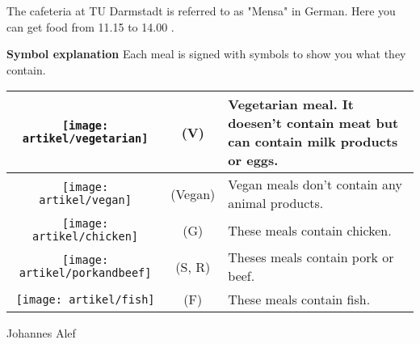 {The cafeteria at TU Darmstadt is referred to as "Mensa" in German.
    Here you can get food from 11.15 to 14.00 .
}{


    \noindent\textbf{Symbol explanation}
    Each meal is signed with symbols to show you what they contain.

    \begin{tabular}{|c|c|p{3cm}|}
        \hline
        \rule{0pt}{1cm+1ex}\texttt{[image: artikel/vegetarian]}  & (V)     & Vegetarian meal. It doesen't contain meat but can contain milk products or eggs. \\
        \hline
        \rule{0pt}{1cm+1ex}\texttt{[image: artikel/vegan]}       & (Vegan) & Vegan meals don't contain any animal products.                                   \\
        \hline
        \rule{0pt}{1cm+1ex}\texttt{[image: artikel/chicken]}     & (G)     & These meals contain chicken.                                                     \\
        \hline
        \rule{0pt}{1cm+1ex}\texttt{[image: artikel/porkandbeef]} & (S, R)  & Theses meals contain pork or beef.                                               \\
        \hline
        \rule{0pt}{1cm+1ex}\texttt{[image: artikel/fish]}        & (F)     & These meals contain fish.                                                        \\
        \hline
    \end{tabular}


}{Johannes Alef}

